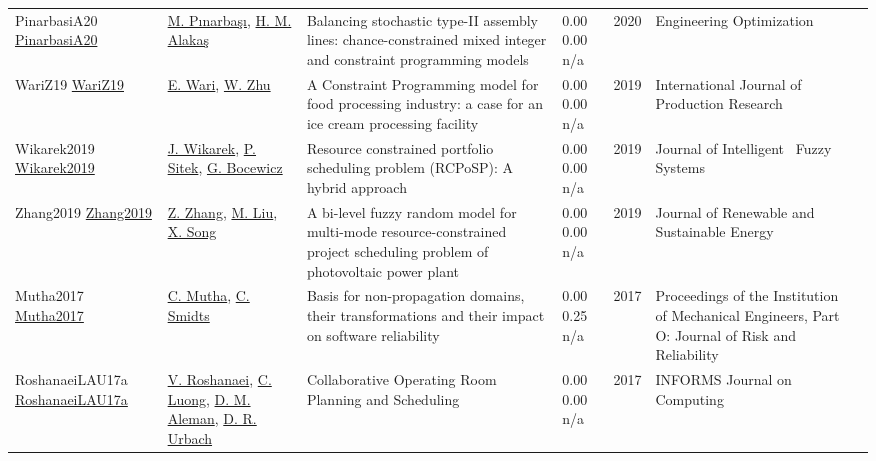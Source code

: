{\begin{longtable}{p{3cm}p{5cm}p{10cm}p{1cm}rp{2.5cm}l}
PinarbasiA20 \href{http://dx.doi.org/10.1080/0305215x.2020.1716746}{PinarbasiA20} & \hyperref[auth:a1383]{M. Pınarbaşı}, \hyperref[auth:a763]{H. M. Alakaş} & Balancing stochastic type-II assembly lines: chance-constrained mixed integer and constraint programming models & \noindent{}\textcolor{black!50}{0.00} \textcolor{black!50}{0.00} n/a & 2020 & \cellcolor{red!20}Engineering Optimization & \cite{PinarbasiA20}\\
WariZ19 \href{http://dx.doi.org/10.1080/00207543.2019.1571250}{WariZ19} & \hyperref[auth:a838]{E. Wari}, \hyperref[auth:a839]{W. Zhu} & A Constraint Programming model for food processing industry: a case for an ice cream processing facility & \noindent{}\textcolor{black!50}{0.00} \textcolor{black!50}{0.00} n/a & 2019 & \cellcolor{red!20}International Journal of Production Research & \cite{WariZ19}\\
Wikarek2019 \href{http://dx.doi.org/10.3233/jifs-179364}{Wikarek2019} & \hyperref[auth:a534]{J. Wikarek}, \hyperref[auth:a1474]{P. Sitek}, \hyperref[auth:a629]{G. Bocewicz} & Resource constrained portfolio scheduling problem (RCPoSP): A hybrid approach & \noindent{}\textcolor{black!50}{0.00} \textcolor{black!50}{0.00} n/a & 2019 & Journal of Intelligent \  Fuzzy Systems & \cite{Wikarek2019}\\
Zhang2019 \href{http://dx.doi.org/10.1063/1.5053623}{Zhang2019} & \hyperref[auth:a1742]{Z. Zhang}, \hyperref[auth:a1743]{M. Liu}, \hyperref[auth:a1744]{X. Song} & A bi-level fuzzy random model for multi-mode resource-constrained project scheduling problem of photovoltaic power plant & \noindent{}\textcolor{black!50}{0.00} \textcolor{black!50}{0.00} n/a & 2019 & Journal of Renewable and Sustainable Energy & \cite{Zhang2019}\\
Mutha2017 \href{http://dx.doi.org/10.1177/1748006x17744380}{Mutha2017} & \hyperref[auth:a1954]{C. Mutha}, \hyperref[auth:a1955]{C. Smidts} & Basis for non-propagation domains, their transformations and their impact on software reliability & \noindent{}\textcolor{black!50}{0.00} 0.25 n/a & 2017 & Proceedings of the Institution of Mechanical Engineers, Part O: Journal of Risk and Reliability & \cite{Mutha2017}\\
RoshanaeiLAU17a \href{http://dx.doi.org/10.1287/ijoc.2017.0745}{RoshanaeiLAU17a} & \hyperref[auth:a727]{V. Roshanaei}, \hyperref[auth:a926]{C. Luong}, \hyperref[auth:a894]{D. M. Aleman}, \hyperref[auth:a895]{D. R. Urbach} & Collaborative Operating Room Planning and Scheduling & \noindent{}\textcolor{black!50}{0.00} \textcolor{black!50}{0.00} n/a & 2017 & \cellcolor{red!20}INFORMS Journal on Computing & \cite{RoshanaeiLAU17a}\\

\end{longtable}}
